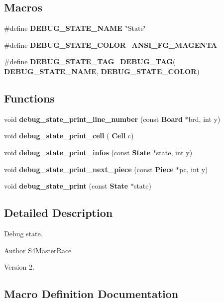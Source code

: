 \subsection*{Macros}
\begin{DoxyCompactItemize}
\item 
\#define \textbf{ D\+E\+B\+U\+G\+\_\+\+S\+T\+A\+T\+E\+\_\+\+N\+A\+ME}~\char`\"{}State\char`\"{}
\item 
\#define \textbf{ D\+E\+B\+U\+G\+\_\+\+S\+T\+A\+T\+E\+\_\+\+C\+O\+L\+OR}~\textbf{ A\+N\+S\+I\+\_\+\+F\+G\+\_\+\+M\+A\+G\+E\+N\+TA}
\item 
\#define \textbf{ D\+E\+B\+U\+G\+\_\+\+S\+T\+A\+T\+E\+\_\+\+T\+AG}~\textbf{ D\+E\+B\+U\+G\+\_\+\+T\+AG}(\textbf{ D\+E\+B\+U\+G\+\_\+\+S\+T\+A\+T\+E\+\_\+\+N\+A\+ME}, \textbf{ D\+E\+B\+U\+G\+\_\+\+S\+T\+A\+T\+E\+\_\+\+C\+O\+L\+OR})
\end{DoxyCompactItemize}
\subsection*{Functions}
\begin{DoxyCompactItemize}
\item 
void \textbf{ debug\+\_\+state\+\_\+print\+\_\+line\+\_\+number} (const \textbf{ Board} $\ast$brd, int y)
\item 
void \textbf{ debug\+\_\+state\+\_\+print\+\_\+cell} (\textbf{ Cell} c)
\item 
void \textbf{ debug\+\_\+state\+\_\+print\+\_\+infos} (const \textbf{ State} $\ast$state, int y)
\item 
void \textbf{ debug\+\_\+state\+\_\+print\+\_\+next\+\_\+piece} (const \textbf{ Piece} $\ast$pc, int y)
\item 
void \textbf{ debug\+\_\+state\+\_\+print} (const \textbf{ State} $\ast$state)
\end{DoxyCompactItemize}


\subsection{Detailed Description}
Debug state. 

\begin{DoxyAuthor}{Author}
S4\+Master\+Race 
\end{DoxyAuthor}
\begin{DoxyVersion}{Version}
2. 
\end{DoxyVersion}


\subsection{Macro Definition Documentation}
\mbox{\label{debug__state_8h_a96a34f31176781b762b4dd049da05bf1}} 
